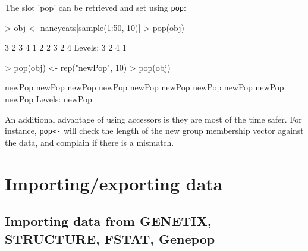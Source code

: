 \documentclass{article}
\begin{document}
\noindent The slot 'pop' can be retrieved and set using \texttt{pop}:
\begin{Schunk}
\begin{Sinput}
> obj <- nancycats[sample(1:50, 10)]
> pop(obj)
\end{Sinput}
\begin{Soutput}
 [1] 3 2 3 4 1 2 2 3 2 4
Levels: 3 2 4 1
\end{Soutput}
\begin{Sinput}
> pop(obj) <- rep("newPop", 10)
> pop(obj)
\end{Sinput}
\begin{Soutput}
 [1] newPop newPop newPop newPop newPop newPop newPop newPop newPop newPop
Levels: newPop
\end{Soutput}
\end{Schunk}
An additional advantage of using accessors is they are most of the time safer. For instance,
\texttt{pop<-} will check the length of the new group membership vector against the data, and
complain if there is a mismatch.






\newpage
\section{Importing/exporting data}


\subsection{Importing data from GENETIX, STRUCTURE, FSTAT, Genepop}
\end{document}
